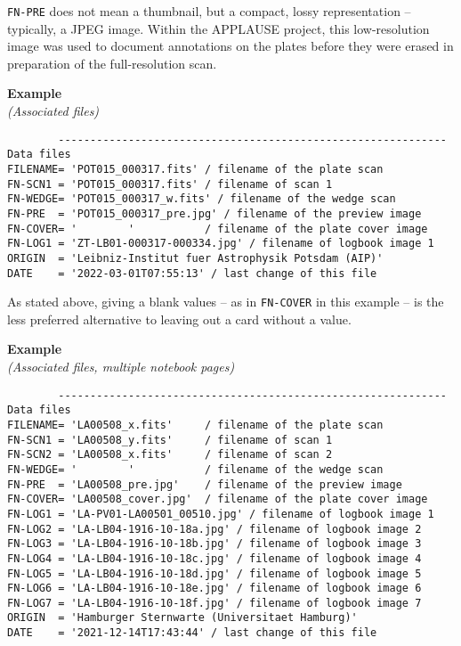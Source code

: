\documentclass[11pt]{ivoa}
\newcommand\cardname[1]{\texttt{\color{keyword}#1}}
\newenvironment{fitsexample}[1]
{\bigskip\noindent\textbf{Example}\\\textit{(#1)\smallskip}}
{\medskip}
\begin{document}
\cardname{FN-PRE} does not mean a thumbnail, but a compact, lossy
representation -- typically, a JPEG image.  Within the APPLAUSE project,
this low-resolution image was used to document annotations on the plates
before they were erased in preparation of the full-resolution scan.


\begin{fitsexample}{Associated files}
\begin{lstlisting}
        ------------------------------------------------------------- Data files
FILENAME= 'POT015_000317.fits' / filename of the plate scan
FN-SCN1 = 'POT015_000317.fits' / filename of scan 1
FN-WEDGE= 'POT015_000317_w.fits' / filename of the wedge scan
FN-PRE  = 'POT015_000317_pre.jpg' / filename of the preview image
FN-COVER= '        '           / filename of the plate cover image
FN-LOG1 = 'ZT-LB01-000317-000334.jpg' / filename of logbook image 1
ORIGIN  = 'Leibniz-Institut fuer Astrophysik Potsdam (AIP)'
DATE    = '2022-03-01T07:55:13' / last change of this file
\end{lstlisting}
\end{fitsexample}

As stated above, giving a blank values -- as in \cardname{FN-COVER} in
this example -- is the less preferred alternative to leaving out a card
without a value.


\begin{fitsexample}{Associated files, multiple notebook pages}
\begin{lstlisting}
        ------------------------------------------------------------- Data files
FILENAME= 'LA00508_x.fits'     / filename of the plate scan
FN-SCN1 = 'LA00508_y.fits'     / filename of scan 1
FN-SCN2 = 'LA00508_x.fits'     / filename of scan 2
FN-WEDGE= '        '           / filename of the wedge scan
FN-PRE  = 'LA00508_pre.jpg'    / filename of the preview image
FN-COVER= 'LA00508_cover.jpg'  / filename of the plate cover image
FN-LOG1 = 'LA-PV01-LA00501_00510.jpg' / filename of logbook image 1
FN-LOG2 = 'LA-LB04-1916-10-18a.jpg' / filename of logbook image 2
FN-LOG3 = 'LA-LB04-1916-10-18b.jpg' / filename of logbook image 3
FN-LOG4 = 'LA-LB04-1916-10-18c.jpg' / filename of logbook image 4
FN-LOG5 = 'LA-LB04-1916-10-18d.jpg' / filename of logbook image 5
FN-LOG6 = 'LA-LB04-1916-10-18e.jpg' / filename of logbook image 6
FN-LOG7 = 'LA-LB04-1916-10-18f.jpg' / filename of logbook image 7
ORIGIN  = 'Hamburger Sternwarte (Universitaet Hamburg)'
DATE    = '2021-12-14T17:43:44' / last change of this file
\end{lstlisting}
\end{fitsexample}
\end{document}
